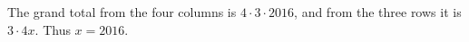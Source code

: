 The grand total from the four columns is $4\cdot3\cdot2016$, and from the three rows it is $3\cdot4x$. Thus $\boxed{x=2016}$.
